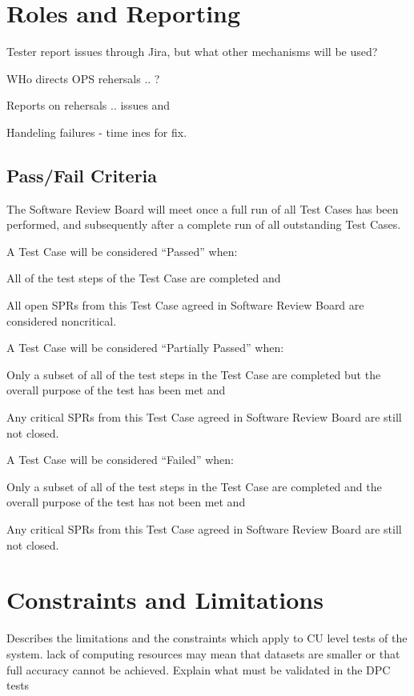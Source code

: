 
\section{Roles and Reporting}

Tester report issues through Jira, but what other mechanisms will be used?

WHo directs OPS rehersals .. ?

Reports on rehersals .. issues and


Handeling failures - time ines for fix.


\subsection{Pass/Fail Criteria}

The Software Review Board will meet once a full run of all Test Cases has been performed, and subsequently after a complete run of all outstanding Test Cases.

A Test Case will be considered ``Passed'' when:
\begin{itemize_single}
\item All of the test steps of the Test Case are completed and
\item All open SPRs from this Test Case agreed in Software Review Board are considered noncritical.
\end{itemize_single}

A Test Case will be considered ``Partially Passed'' when:
\begin{itemize_single}
\item Only a subset of all of the test steps in the Test Case are completed but the overall purpose of the test has been met and
\item Any critical SPRs from this Test Case agreed in Software Review Board are still not closed.
\end{itemize_single}

A Test Case will be considered ``Failed'' when:
\begin{itemize_single}
\item Only a subset of all of the test steps in the Test Case are completed and the overall purpose of the test has not been met and
\item Any critical SPRs from this Test Case agreed in Software Review Board are still not closed.
\end{itemize_single}

\section{Constraints and Limitations}

Describes the limitations and the constraints which apply to CU level tests of the system. lack of computing resources may mean that datasets are smaller or that full accuracy cannot be achieved. Explain what must be validated in the DPC tests
